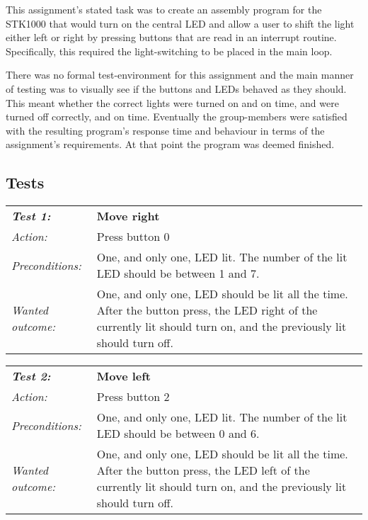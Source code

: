 This assignment’s stated task was to create an assembly program for the STK1000 that would turn on the central LED and allow a user to shift the light either left or right by pressing buttons that are read in an interrupt routine. Specifically, this required the light-switching to be placed in the main loop.

There was no formal test-environment for this assignment and the main manner of testing was to visually see if the buttons and LEDs behaved as they should. This meant whether the correct lights were turned on and on time, and were turned off correctly, and on time. 
Eventually the group-members were satisfied with the resulting program’s response time and behaviour in terms of the assignment’s requirements. At that point the program was deemed finished.

\subsection{Tests}

\begin{tabular}[h]{|lp{12cm}|} \hline
\textbf{\emph{Test 1:}} 		& \textbf{Move right}\\
\emph{Action:} 		& Press button 0\\
\emph{Preconditions:}	& One, and only one, LED lit. The number of the lit LED should be between 1 and 7.\\
\emph{Wanted outcome:}	& One, and only one, LED should be lit all the time. After the button press, the LED right of the currently lit should turn on, and the previously lit should turn off.\\ \hline
\end{tabular}

\vspace{1cm}

\begin{tabular}[h]{|lp{12cm}|} \hline
\textbf{\emph{Test 2:}} 		& \textbf{Move left}\\
\emph{Action:} 		& Press button 2\\
\emph{Preconditions:}	& One, and only one, LED lit. The number of the lit LED should be between 0 and 6.\\
\emph{Wanted outcome:}	& One, and only one, LED should be lit all the time. After the button press, the LED left of the currently lit should turn on, and the previously lit should turn off. \\ \hline
\end{tabular}

